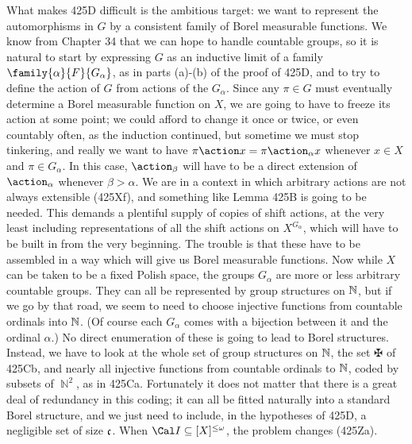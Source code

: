 {What makes 425D difficult is the ambitious target:  we
want to represent the automorphisms in $G$ by
a consistent family of Borel measurable
functions.   We know from Chapter 34 that we can hope to handle countable
groups, so it is natural to start by expressing $G$ as an inductive limit
of a family $\family{\alpha}{F}{G_{\alpha}}$, as in parts (a)-(b) of the
proof of 425D, and to try to define the action of $G$ from actions of the
$G_{\alpha}$.   Since any $\pi\in G$ must eventually determine a
Borel measurable function on $X$, we are going to have to
freeze its action at some point;  we could afford to change it once or
twice, or even countably often, as the induction continued, but sometime
we must stop tinkering, and really we want to have
$\pi\action x=\pi\action_{\alpha}x$ whenever $x\in X$ and
$\pi\in G_{\alpha}$.   In this case, $\action_{\beta}$ will have to be a
direct extension of $\action_{\alpha}$ whenever $\beta>\alpha$.
We are in a context in which arbitrary actions are not always
extensible (425Xf), and something like Lemma 425B is going to be needed.
This demands a plentiful supply of copies of shift actions,
at the very least including representations of all the shift actions on
$X^{G_{\alpha}}$, which will have to be built in from the very beginning.
The trouble is that these have to be assembled in a way which will
give us Borel measurable functions.   Now while $X$ can be taken to be a
fixed Polish space, the groups $G_{\alpha}$ are more or less arbitrary
countable groups.   They can all be represented by group structures on
$\Bbb N$, but if we go by that road, we seem to need to choose
injective functions from countable ordinals into $\Bbb N$.   (Of course
each $G_{\alpha}$ comes with a bijection between it and the ordinal
$\alpha$.)
No direct enumeration of these is going to lead to Borel structures.
Instead, we have to look at the whole set of group structures on
$\Bbb N$, the set $\maltese$ of 425Cb, and nearly all injective
functions from countable ordinals to $\Bbb N$, coded by subsets of
$\BbbN^2$, as in 425Ca.   Fortunately it does not matter that there is a
great deal of redundancy in this coding;  it can all be fitted naturally
into a standard Borel structure, and we just need to include, in the
hypotheses of 425D, a negligible set of size $\frak c$.
When $\Cal I\subseteq[X]^{\le\omega}$, the problem changes (425Za).

}
